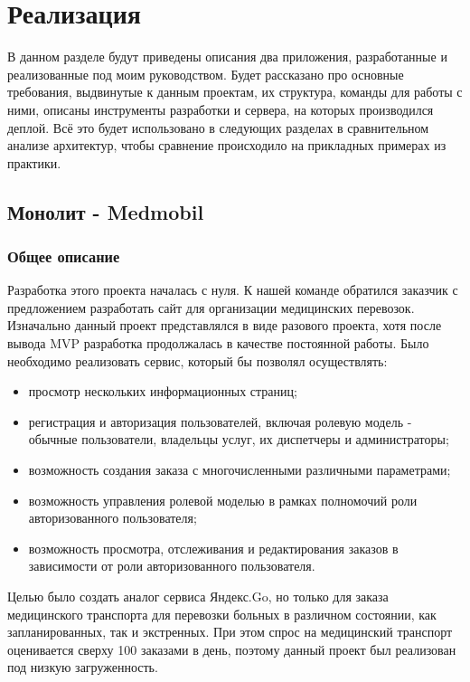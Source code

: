 \section{Реализация}

    В данном разделе будут приведены описания два приложения, разработанные и реализованные под моим руководством. Будет рассказано про основные требования, выдвинутые к данным проектам, их структура, команды для работы с ними, описаны инструменты разработки и сервера, на которых производился деплой. Всё это будет использовано в следующих разделах в сравнительном анализе архитектур, чтобы сравнение происходило на прикладных примерах из практики.

\subsection{Монолит - Medmobil}

    \subsubsection{Общее описание}
    Разработка этого проекта началась с нуля. К нашей команде обратился заказчик с предложением разработать сайт для организации медицинских перевозок. Изначально данный проект представлялся в виде разового проекта, хотя после вывода MVP разработка продолжалась в качестве постоянной работы. Было необходимо реализовать сервис, который бы позволял осуществлять:
    \begin{itemize}
        \item просмотр нескольких информационных страниц;
        \item регистрация и авторизация пользователей, включая ролевую модель - обычные пользователи, владельцы услуг, их диспетчеры и администраторы;
        \item возможность создания заказа с многочисленными различными параметрами;
        \item возможность управления ролевой моделью в рамках полномочий роли авторизованного пользователя;
        \item возможность просмотра, отслеживания и редактирования заказов в зависимости от роли авторизованного пользователя.
    \end{itemize}
    Целью было создать аналог сервиса Яндекс.Go, но только для заказа медицинского транспорта для перевозки больных в различном состоянии, как запланированных, так и экстренных. При этом спрос на медицинский транспорт оценивается сверху 100 заказами в день, поэтому данный проект был реализован под низкую загруженность.

